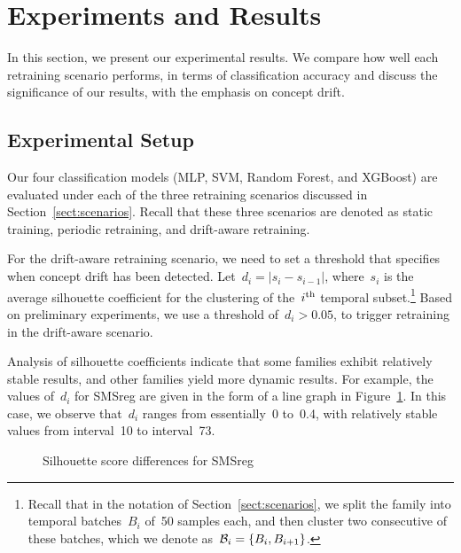 \documentclass[12pt]{article}
\begin{document}
\section{Experiments and Results}\label{chap:ER}

In this section, we present our experimental results. 
We compare how well each retraining scenario performs,
in terms of classification accuracy and discuss the significance of 
our results, with the emphasis on concept drift. 

\subsection{Experimental Setup}\label{sect:setup}

Our four classification models (MLP, SVM, Random Forest, and XGBoost)
are evaluated under each of the three retraining scenarios discussed in
Section~\ref{sect:scenarios}. Recall that these three scenarios are denoted
as static training, periodic retraining, and drift-aware retraining.

For the drift-aware retraining scenario, we need to set a threshold that specifies 
when concept drift has been detected. Let~$d_i = |s_i - s_{i-1}|$,
where~$s_i$ is the average silhouette coefficient for the
clustering of the~$i^{\operatorname{th}}$ temporal subset.\footnote{Recall that
in the notation of Section~\ref{sect:scenarios}, we split the 
family into temporal batches~$B_i$ of~50 samples each,
and then cluster two consecutive of these batches, which we
denote as~${\cal B}_i = \{B_i,B_{i+1}\}$.}
Based on preliminary experiments,
we use a threshold of~$d_i > 0.05$,
to trigger retraining in the drift-aware scenario.

Analysis of silhouette coefficients indicate that some families
exhibit relatively stable results, and other families yield more dynamic results. 
For example, the values of~$d_i$ for SMSreg are given in the form of
a line graph in Figure~\ref{fig:SMS_sil}. In this case, 
we observe that~$d_i$ ranges from essentially~0 to~0.4,
with relatively stable values from interval~10 to interval~73.


\begin{figure}[!htb]
    \centering
    
    \caption{Silhouette score differences for SMSreg}\label{fig:SMS_sil}
\end{figure}
\end{document}
